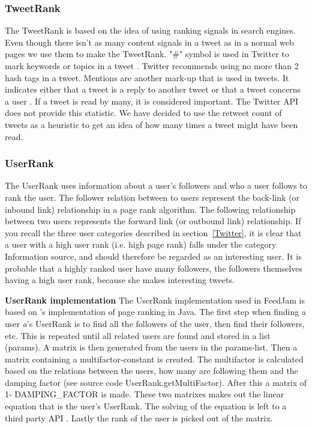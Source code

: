 \subsubsection{TweetRank}
The TweetRank is based on the idea of using ranking signals in search engines. Even though there isn't as many content signals in a tweet as in a normal web pages we use them to make the TweetRank. "\#" symbol is used in Twitter to mark keywords or topics in a tweet \citep{Twitter}. Twitter recommends using no more than 2 hash tags in a tweet. 
Mentions are another mark-up that is used in tweets. It indicates either that a tweet is a reply to another tweet or that a tweet concerns a user \citep{Twitterb}. If a tweet is read by many, it is considered important. The Twitter API does not provide this statistic. We have decided to use the retweet count of tweets as a heuristic to get an idea of how many times a tweet might have been read.

\subsubsection{UserRank}
The UserRank uses information about a user's followers and who a user follows to rank the user. The follower relation between to users represent the back-link (or inbound link) relationship in a page rank algorithm. The following relationship between two users represents the forward link (or outbound link) relationship. If you recall the three user categories described in section~\ref{Twitter}, it is clear that a user with a high user rank (i.e. high page rank) falls under the category Information source, and should therefore be regarded as an interesting user. It is probable that a highly ranked user have many followers, the followers themselves having a high user rank, because she makes interesting tweets.

{\bf UserRank implementation}\newline
The UserRank implementation used in FeedJam is based on \citet{Goodrarzi2009}'s implementation of page ranking in Java. The first step when finding a user \emph{a}'s UserRank is to find all the followers of the user, then find their followers, etc. This is repeated until all related users are found and stored in a list (params). A matrix is then generated from the users in the params-list. Then a matrix containing a multifactor-constant is created. The multifactor is calculated based on the relations between the users, how many are following them and the damping factor (see source code UserRank.getMultiFactor). After this a matrix of 1- DAMPING\_FACTOR is made. These two matrixes makes out the linear equation that is the user's UserRank. The solving of the equation is left to a third party API \citep{Jama}. Lastly the rank of the user is picked out of the matrix.

